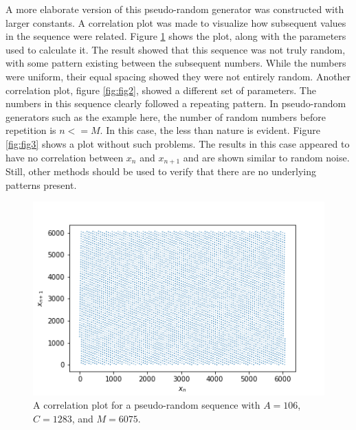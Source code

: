 \documentclass[twocolumn]{article}
\begin{document}
A more elaborate version of this pseudo-random generator was constructed with larger constants. A correlation plot was made to visualize how subsequent values in the sequence were related. Figure \ref{fig:fig1} shows the plot, along with the parameters used to calculate it. The result showed that this sequence was not truly random, with some pattern existing between the subsequent numbers. While the numbers were uniform, their equal spacing showed they were not entirely random. Another correlation plot, figure \ref{fig:fig2}, showed a different set of parameters. The numbers in this sequence clearly followed a repeating pattern. In pseudo-random generators such as  the example here, the number of random numbers before repetition is $n <= M$. In this case, the less than nature is evident. Figure \ref{fig:fig3} shows a plot without such problems. The results in this case appeared to have no correlation between $x_n$ and $x_{n+1}$ and are shown similar to random noise. Still, other methods should be used to verify that there are no underlying patterns present. 

\begin{figure}[h]
\centering
\includegraphics[width=\linewidth]{fig1}
\caption{A correlation plot for a pseudo-random sequence with $A=106$, $C=1283$, and $M=6075$.}
\label{fig:fig1}
\end{figure}
\end{document}
